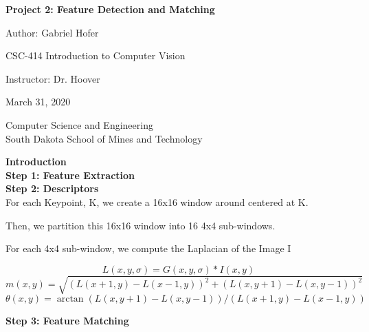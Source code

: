 \documentclass[12pt]{article}
\begin{document}
\begin{titlepage}
   \begin{center}
       \vspace*{1cm}
       \large
       \textbf{Project 2: Feature Detection and Matching}
       \normalsize

       \vspace{0.5cm}

       Author: Gabriel Hofer

       \vspace{0.5cm}

       CSC-414 Introduction to Computer Vision

       \vspace{0.5cm}

       Instructor: Dr. Hoover

       \vspace{0.5cm}

        March 31, 2020

       \vfill

       Computer Science and Engineering\\
       South Dakota School of Mines and Technology\\
   \end{center}
\end{titlepage}
\newpage



\small
\textbf{Introduction}\\ 



\textbf{Step 1: Feature Extraction}\\ 

\textbf{Step 2: Descriptors}\\

For each Keypoint, K, we create a 16x16 window around centered at K.

Then, we partition this 16x16 window into 16 4x4 sub-windows.

For each 4x4 sub-window, we compute the Laplacian of the Image I


\[
    L(x,y,\sigma) = G(x,y,\sigma) * I(x,y)
\]
\[
    m(x,y) = \sqrt{(L(x+1,y)-L(x-1,y))^2+(L(x,y+1)-L(x,y-1))^2}
\]
\[
    \theta (x,y) = \arctan{(L(x,y+1)-L(x,y-1))/(L(x+1,y)-L(x-1,y))}
\]





\textbf{Step 3: Feature Matching}\\
\end{document}
